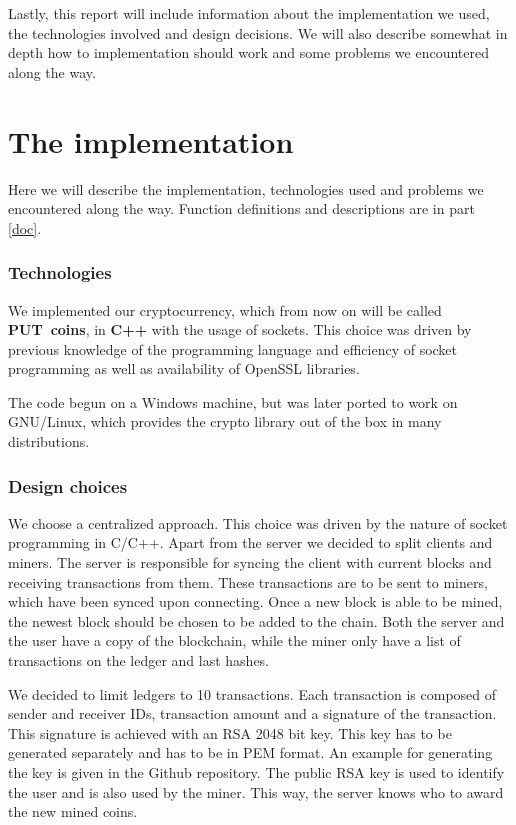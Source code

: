 \documentclass{article}
\begin{document}
Lastly, this report will include information about the implementation we used, the technologies involved and design decisions. We will also describe somewhat in depth how to implementation should work and some problems we encountered along the way. 


\newpage
\part{The implementation}
Here we will describe the implementation, technologies used and problems we encountered along the way. Function definitions and descriptions are in part \ref{doc}.

\section{Technologies}
We implemented our cryptocurrency, which from now on will be called \textbf{PUT~coins}, in \textbf{C++} with the usage of sockets. This choice was driven by previous knowledge of the programming language and efficiency of socket programming as well as availability of OpenSSL libraries. \\ \par
The code begun on a Windows machine, but was later ported to work on GNU/Linux, which provides the crypto library out of the box in many distributions.

\section{Design choices}
We choose a centralized approach. This choice was driven by the nature of socket programming in C/C++. Apart from the server we decided to split clients and miners. The server is responsible for syncing the client with current blocks and receiving transactions from them. These transactions are to be sent to miners, which have been synced upon connecting. Once a new block is able to be mined, the newest block should be chosen to be added to the chain. Both the server and the user have a copy of the blockchain, while the miner only have a list of transactions on the ledger and last hashes. \\ \par

We decided to limit ledgers to 10 transactions. Each transaction is composed of sender and receiver IDs, transaction amount and a signature of the transaction. This signature is achieved with an RSA 2048 bit key. This key has to be generated separately and has to be in PEM format. An example for generating the key is given in the Github repository. The public RSA key is used to identify the user and is also used by the miner. This way, the server knows who to award the new mined coins. \\ \par
\end{document}
